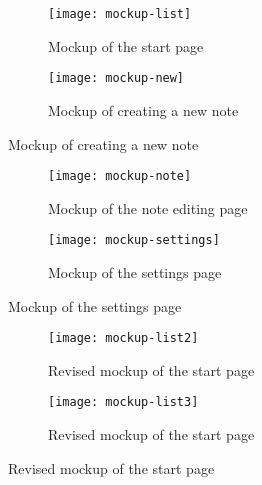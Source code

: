 \begin{figure}[H]
  \begin{subfigure}{.5\textwidth}
    \caption{Mockup of the start page}
    \centering
    \texttt{[image: mockup-list]}
  \end{subfigure}
  \begin{subfigure}{.5\textwidth}
    \caption{Mockup of creating a new note}
    \centering
    \texttt{[image: mockup-new]}
  \end{subfigure}
\end{figure}

\begin{figure}[H]
  \setcounter{subfigure}{2}
  \begin{subfigure}{.5\textwidth}
    \caption{Mockup of the note editing page}
    \centering
    \texttt{[image: mockup-note]}
  \end{subfigure}
  \begin{subfigure}{.5\textwidth}
    \caption{Mockup of the settings page}
    \centering
    \texttt{[image: mockup-settings]}
  \end{subfigure}
\end{figure}

\begin{figure}[H]
  \setcounter{subfigure}{2}
  \begin{subfigure}{.5\textwidth}
    \caption{Revised mockup of the start page}
    \centering
    \texttt{[image: mockup-list2]}
  \end{subfigure}
  \begin{subfigure}{.5\textwidth}
    \caption{Revised mockup of the start page}
    \centering
    \texttt{[image: mockup-list3]}
  \end{subfigure}
\end{figure}


